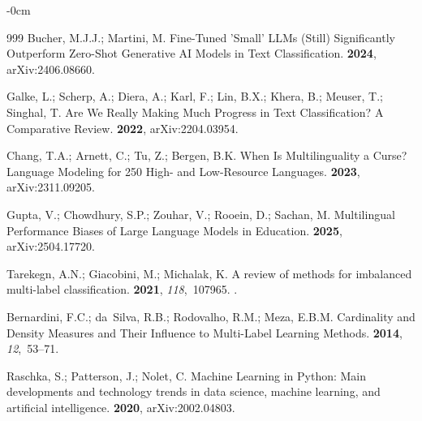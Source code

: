 \documentclass[make,article,accept,pdftex,moreauthors]{Definitions/mdpi}
\begin{document}
\begin{adjustwidth}{-\extralength}{0cm}
\begin{thebibliography}{999}
Bucher, M.J.J.; Martini, M.
\newblock Fine-Tuned 'Small' LLMs (Still) Significantly Outperform Zero-Shot
  Generative AI Models in Text Classification.
 {\bf 2024}, arXiv:2406.08660.

Galke, L.; Scherp, A.; Diera, A.; Karl, F.; Lin, B.X.; Khera, B.; Meuser, T.;
  Singhal, T.
\newblock Are We Really Making Much Progress in Text Classification? A
  Comparative Review.
 {\bf 2022}, arXiv:2204.03954.

Chang, T.A.; Arnett, C.; Tu, Z.; Bergen, B.K.
\newblock When Is Multilinguality a Curse? Language Modeling for 250 High- and
  Low-Resource Languages.
 {\bf 2023}, arXiv:2311.09205.

Gupta, V.; Chowdhury, S.P.; Zouhar, V.; Rooein, D.; Sachan, M.
\newblock Multilingual Performance Biases of Large Language Models in
  Education.
 {\bf 2025}, arXiv:2504.17720.

Tarekegn, A.N.; Giacobini, M.; Michalak, K.
\newblock A review of methods for imbalanced multi-label classification.
 {\bf 2021}, {\em 118},~107965.
.

Bernardini, F.C.; da~Silva, R.B.; Rodovalho, R.M.; Meza, E.B.M.
\newblock Cardinality and Density Measures and Their Influence to Multi-Label
  Learning Methods.
 {\bf 2014}, {\em 12},~53--71.

Raschka, S.; Patterson, J.; Nolet, C.
\newblock Machine Learning in Python: Main developments and technology trends
  in data science, machine learning, and artificial intelligence.
 {\bf 2020}, arXiv:2002.04803.


\end{thebibliography}
\end{adjustwidth}
\end{document}
